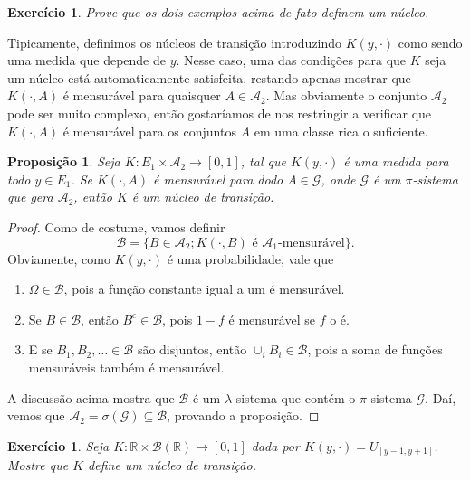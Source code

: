 \documentclass[reqno]{article}
\newcommand*\1{\mathds{1}}
\newtheorem{proposition}[theorem]{Proposição}
\newtheorem{exercise}[example]{Exercício}
\begin{document}
\begin{exercise}
  Prove que os dois exemplos acima de fato definem um núcleo.
\end{exercise}

Tipicamente, definimos os núcleos de transição introduzindo $K(y, \cdot)$ como sendo uma medida que depende de $y$.
Nesse caso, uma das condições para que $K$ seja um núcleo está automaticamente satisfeita, restando apenas mostrar que $K(\cdot, A)$ é mensurável para quaisquer $A \in \mathcal{A}_2$.
Mas obviamente o conjunto $\mathcal{A}_2$ pode ser muito complexo, então gostaríamos de nos restringir a verificar que $K(\cdot, A)$ é mensurável para os conjuntos $A$ em uma classe rica o suficiente.

\begin{proposition}
  \label{p:K_nucleo_na_classe}
  Seja $K:E_1 \times \mathcal{A}_2 \to [0,1]$, tal que $K(y, \cdot)$ é uma medida para todo $y \in E_1$.
  Se $K(\cdot, A)$ é mensurável para dodo $A \in \mathcal{G}$, onde $\mathcal{G}$ é um $\pi$-sistema que gera $\mathcal{A}_2$, então $K$ é um núcleo de transição.
\end{proposition}

\begin{proof}
  Como de costume, vamos definir
  \begin{equation}
    \mathcal{B} = \{B \in \mathcal{A}_2; K(\cdot, B) \text{ é $\mathcal{A}_1$-mensurável}\}.
  \end{equation}
  Obviamente, como $K(y, \cdot)$ é uma probabilidade, vale que
  \begin{enumerate}[\quad a)]
  \item $\Omega \in \mathcal{B}$, pois a função constante igual a um é mensurável.
  \item Se $B \in \mathcal{B}$, então $B^c \in \mathcal{B}$, pois $1 - f$ é mensurável se $f$ o é.
  \item E se $B_1, B_2, \dots \in \mathcal{B}$ são disjuntos, então $\cup_i B_i \in \mathcal{B}$, pois a soma de funções mensuráveis também é mensurável.
  \end{enumerate}

  A discussão acima mostra que $\mathcal{B}$ é um $\lambda$-sistema que contém o $\pi$-sistema $\mathcal{G}$.
  Daí, vemos que $\mathcal{A}_2 = \sigma(\mathcal{G}) \subseteq \mathcal{B}$, provando a proposição.
\end{proof}

\begin{exercise}
  Seja $K:\mathbb{R} \times \mathcal{B}(\mathbb{R}) \to [0,1]$ dada por $K(y, \cdot) = U_{[y - 1,y + 1]}$.
  Mostre que $K$ define um núcleo de transição.
\end{exercise}
\end{document}
